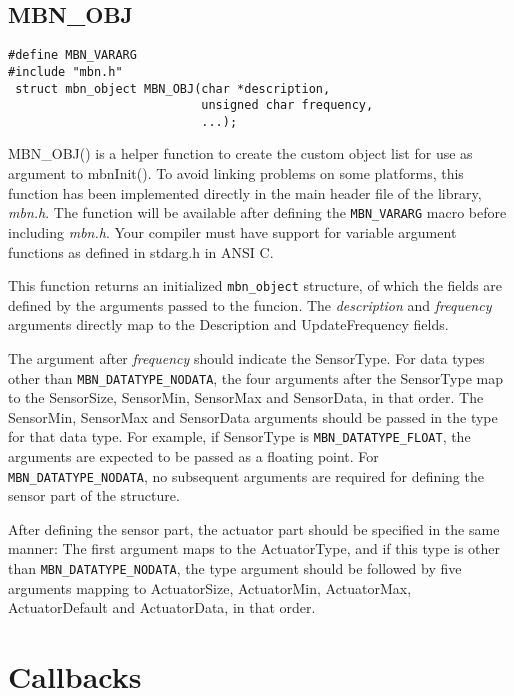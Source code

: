 \documentclass[a4paper]{report}
\begin{document}
\subsection{MBN\_OBJ}
\begin{verbatim}
#define MBN_VARARG
#include "mbn.h"
 struct mbn_object MBN_OBJ(char *description,
                           unsigned char frequency,
                           ...);
\end{verbatim}
MBN\_OBJ() is a helper function to create the custom object list for use as argument to mbnInit(). To avoid linking problems on some platforms, this function has been implemented directly in the main header file of the library, \textit{mbn.h}. The function will be available after defining the \verb|MBN_VARARG| macro before including \textit{mbn.h}. Your compiler must have support for variable argument functions as defined in stdarg.h in ANSI C.

This function returns an initialized \verb|mbn_object| structure, of which the fields are defined by the arguments passed to the funcion. The \textit{description} and \textit{frequency} arguments directly map to the Description and UpdateFrequency fields.

The argument after \textit{frequency} should indicate the SensorType. For data types other than \verb|MBN_DATATYPE_NODATA|, the four arguments after the SensorType map to the SensorSize, SensorMin, SensorMax and SensorData, in that order. The SensorMin, SensorMax and SensorData arguments should be passed in the type for that data type. For example, if SensorType is \verb|MBN_DATATYPE_FLOAT|, the arguments are expected to be passed as a floating point. For \verb|MBN_DATATYPE_NODATA|, no subsequent arguments are required for defining the sensor part of the structure.

After defining the sensor part, the actuator part should be specified in the same manner: The first argument maps to the ActuatorType, and if this type is other than \verb|MBN_DATATYPE_NODATA|, the type argument should be followed by five arguments mapping to ActuatorSize, ActuatorMin, ActuatorMax, ActuatorDefault and ActuatorData, in that order.




\cleardoublepage
\section{Callbacks}
\label{sec:cb}
\end{document}
